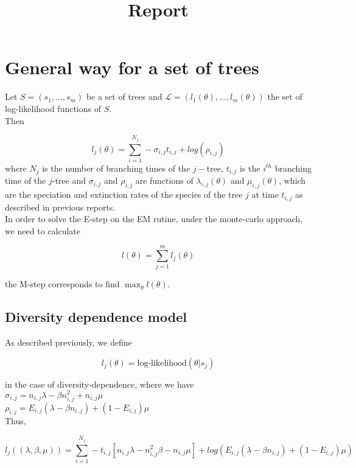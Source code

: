 \documentclass[]{article}
\title{Report}
\author{}
\begin{document}

\vspace*{-2cm}
\section*{General way for a set of trees}

Let $S=(s_1,...,s_m)$ be a set of trees and $ \mathcal{L} = (l_1(\theta),...,l_m(\theta))$ the set of log-likelihood functions of $S$. \\

Then 

$$ l_j(\theta) = \displaystyle\sum_{i=1}^{N_j} - \sigma_{i,j} t_{i,j}+log(\rho_{i,j}) $$
where $N_j$ is the number of branching times of the $j-$tree, $t_{i,j}$ is the $i^{th}$ branching time of the $j$-tree and $\sigma_{i,j}$ and $\rho_{i,j}$ are functions of $\lambda_{i,j}(\theta)$ and $\mu_{i,j}(\theta)$, which are the speciation and extinction rates of the species of the tree $j$ at time $t_{i,j}$ as described in previous reports.\\

In order to solve the E-step on the EM rutine, under the monte-carlo approach, we need to calculate 

$$ l(\theta) = \displaystyle\sum_{j = 1}^m l_j(\theta) $$

the M-step corresponds to find $\max_{\theta} l(\theta) $.

\subsection*{Diversity dependence model}

 
As described previously, we define 

$$ l_j(\theta) = \text{log-likelihood}(\theta | s_j) $$

in the case of diversity-dependence, where we have \\

$\sigma_{i,j} = n_{i,j}\lambda -\beta n_{i,j}^2+n_{i,j}\mu$ \\
$\rho_{i,j} = E_{i,j}(\lambda-\beta n_{i,j})+(1-E_{i,j})\mu$ \\

Thus,

$$ l_j((\lambda,\beta,\mu)) = \displaystyle\sum_{i=1}^{N_j} -t_{i,j}[n_{i,j}\lambda-n_{i,j}^2 \beta - n_{i,j}\mu]+log(E_{i,j}(\lambda-\beta n_{i,j})+(1-E_{i,j})\mu)$$
\end{document}
